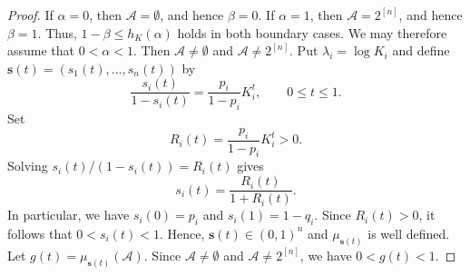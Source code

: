 \documentclass[11pt]{article}
\numberwithin{equation}{section}
\theoremstyle{definition}
\theoremstyle{remark}
\begin{document}
\begin{proof}
If $\alpha=0$, then 
$\mathcal{A}=\emptyset$, and hence $\beta=0$. If $\alpha=1$, then
$\mathcal{A}=2^{[n]}$, and hence $\beta=1$. Thus,
$
 1-\beta\leq h_K(\alpha)
$ holds in both boundary cases. We may therefore
assume that $0<\alpha<1$. Then
$\mathcal{A}\neq\emptyset$ and 
$\mathcal{A}\neq 2^{[n]}$.
Put
$
 \lambda_i=\log K_i
$
and define $\mathbf s(t)=(s_1(t),\ldots,s_n(t))$ by
\begin{equation*}
 \frac{s_i(t)}{1-s_i(t)}
 =
 \frac{p_i}{1-p_i}K_i^t,
 \qquad 0\leq t\leq1.
\end{equation*}
Set
\begin{equation*}
 R_i(t)=\frac{p_i}{1-p_i}K_i^t>0.
\end{equation*}
Solving $s_i(t)/(1-s_i(t))=R_i(t)$ gives
\begin{equation*}
 s_i(t)=\frac{R_i(t)}{1+R_i(t)}.
\end{equation*}
In particular, we have $s_i(0)=p_i$ and $s_i(1)=1-q_i$. 
Since $R_i(t)>0$, it follows  that
$0<s_i(t)<1$. Hence, $\mathbf s(t)\in(0,1)^n$ and
$\mu_{\mathbf s(t)}$ is well defined.
Let
$
 g(t)=\mu_{\mathbf s(t)}(\mathcal{A}).
$
Since $\mathcal{A}\neq\emptyset$ and 
$\mathcal{A}\neq 2^{[n]}$, we have $0<g(t)<1$.



\end{proof}
\end{document}
